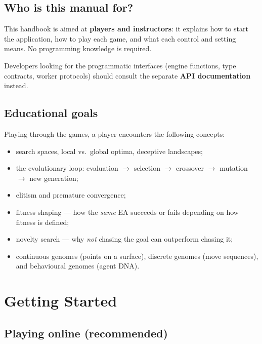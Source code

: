 \documentclass[11pt,a4paper]{report}
\begin{document}
\section{Who is this manual for?}

This handbook is aimed at \textbf{players and instructors}: it explains how to
start the application, how to play each game, and what each control and
setting means. No programming knowledge is required.

Developers looking for the programmatic interfaces (engine functions, type
contracts, worker protocols) should consult the separate
\textbf{API documentation} instead.

\section{Educational goals}

Playing through the games, a player encounters the following concepts:

\begin{itemize}
  \item search spaces, local vs.\ global optima, deceptive landscapes;
  \item the evolutionary loop: evaluation $\to$ selection $\to$ crossover
        $\to$ mutation $\to$ new generation;
  \item elitism and premature convergence;
  \item fitness shaping --- how the \emph{same} EA succeeds or fails
        depending on how fitness is defined;
  \item novelty search --- why \emph{not} chasing the goal can outperform
        chasing it;
  \item continuous genomes (points on a surface), discrete genomes
        (move sequences), and behavioural genomes (agent DNA).
\end{itemize}

\chapter{Getting Started}

\section{Playing online (recommended)}
\end{document}
